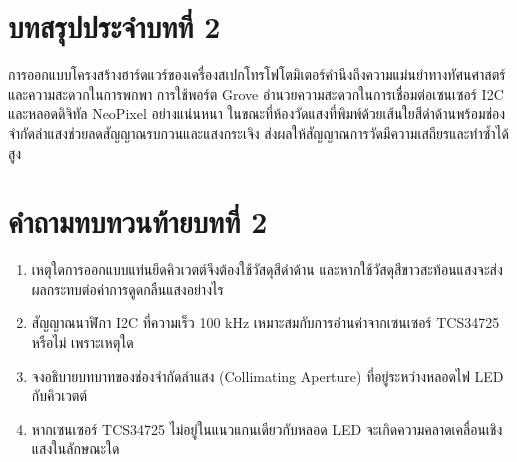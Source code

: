 \section*{บทสรุปประจำบทที่ 2}
การออกแบบโครงสร้างฮาร์ดแวร์ของเครื่องสเปกโทรโฟโตมิเตอร์คำนึงถึงความแม่นยำทางทัศนศาสตร์และความสะดวกในการพกพา การใช้พอร์ต Grove อำนวยความสะดวกในการเชื่อมต่อเซนเซอร์ I2C และหลอดดิจิทัล NeoPixel อย่างแน่นหนา ในขณะที่ห้องวัดแสงที่พิมพ์ด้วยเส้นใยสีดำด้านพร้อมช่องจำกัดลำแสงช่วยลดสัญญาณรบกวนและแสงกระเจิง ส่งผลให้สัญญาณการวัดมีความเสถียรและทำซ้ำได้สูง

\section*{คำถามทบทวนท้ายบทที่ 2}
\begin{enumerate}[leftmargin=1.5em, itemsep=3pt]
    \item เหตุใดการออกแบบแท่นยึดคิวเวตต์จึงต้องใช้วัสดุสีดำด้าน และหากใช้วัสดุสีขาวสะท้อนแสงจะส่งผลกระทบต่อค่าการดูดกลืนแสงอย่างไร
    \item สัญญาณนาฬิกา I2C ที่ความเร็ว 100 kHz เหมาะสมกับการอ่านค่าจากเซนเซอร์ TCS34725 หรือไม่ เพราะเหตุใด
    \item จงอธิบายบทบาทของช่องจำกัดลำแสง (Collimating Aperture) ที่อยู่ระหว่างหลอดไฟ LED กับคิวเวตต์
    \item หากเซนเซอร์ TCS34725 ไม่อยู่ในแนวแกนเดียวกับหลอด LED จะเกิดความคลาดเคลื่อนเชิงแสงในลักษณะใด
\end{enumerate}
